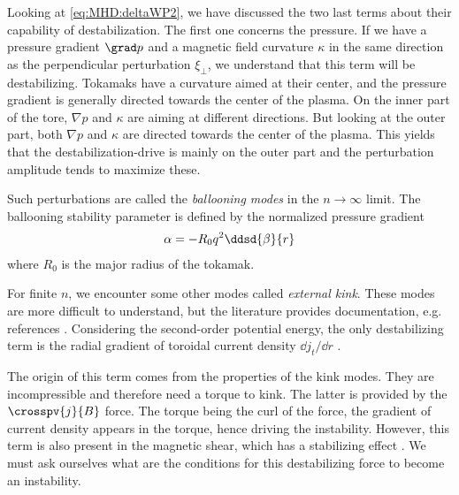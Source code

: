 Looking at \eqref{eq:MHD:deltaWP2}, we have discussed the two last terms about their capability of destabilization. The first one concerns the pressure. If we have a pressure gradient $\grad p$ and a magnetic field curvature $\kappa$ in the same direction as the perpendicular perturbation $\xi_{\perp}$, we understand that this term will be destabilizing. Tokamaks have a curvature aimed at their center, and the pressure gradient is generally directed towards the center of the plasma. On the inner part of the tore, $\nabla p$ and $\kappa$ are aiming at different directions. But looking at the outer part, both $\nabla p$ and $\kappa$ are directed towards the center of the plasma. This yields that the destabilization-drive is mainly on the outer part and the perturbation amplitude tends to maximize these. \Hum

Such perturbations are called the \emph{ballooning modes} in the $n \rightarrow \infty$ limit. The ballooning stability parameter is defined by the normalized pressure gradient
\begin{align*}
	\alpha = - R_0 q^2 \ddsd{\beta}{r}
\end{align*}
where $R_0$ is the major radius of the tokamak.

For finite $n$, we encounter some other modes called \emph{external kink}. These modes are more difficult to understand, but the literature provides documentation, e.g. references \cite{wesson1978,lortz1975}. Considering the second-order potential energy, the only destabilizing term is the radial gradient of toroidal current density $\dd j_t / \dd r$ \cite{wesson1978}.

The origin of this term comes from the properties of the kink modes. They are incompressible and therefore need a torque to kink. The latter is provided by the $\crosspv{j}{B}$ force. The torque being the curl of the force, the gradient of current density appears in the torque, hence driving the instability. However, this term is also present in the magnetic shear, which has a stabilizing effect \cite{wesson1978}. We must ask ourselves what are the conditions for this destabilizing force to become an instability.

